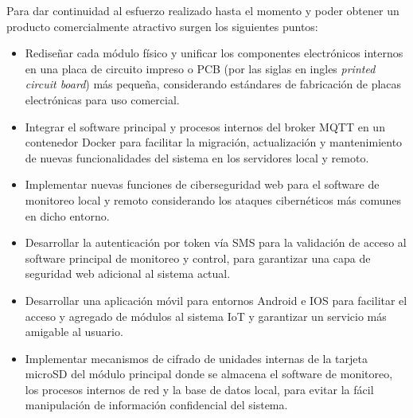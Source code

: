 Para dar continuidad al esfuerzo realizado hasta el momento y poder obtener un producto comercialmente atractivo surgen los siguientes puntos: 

\begin{itemize}

\item Rediseñar cada módulo físico y unificar los componentes electrónicos internos en una placa de circuito impreso o PCB (por las siglas en ingles \emph{printed circuit board}) más pequeña, considerando estándares de fabricación de placas electrónicas para uso comercial.


\item Integrar el software principal y procesos internos del broker MQTT en un contenedor Docker para facilitar la migración, actualización y mantenimiento de nuevas funcionalidades del sistema en los servidores local y remoto.

\item Implementar nuevas funciones de ciberseguridad web para el software de monitoreo local y remoto considerando los ataques cibernéticos más comunes en dicho entorno.

\item Desarrollar la autenticación por token vía SMS para la validación de acceso al software principal de monitoreo y control, para garantizar una capa de seguridad web adicional al sistema actual.

\item Desarrollar una aplicación móvil para entornos Android e IOS para facilitar el acceso y agregado de módulos al sistema IoT y garantizar un servicio más amigable al usuario.




\item Implementar mecanismos de cifrado de unidades internas de la tarjeta microSD del módulo principal donde se almacena el software de monitoreo, los procesos internos de red y la base de datos local, para evitar la fácil manipulación de información confidencial del sistema.



\end{itemize}
